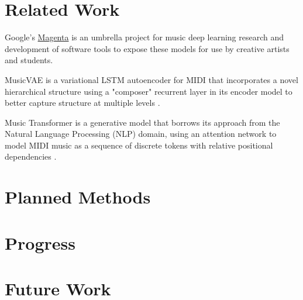 \documentclass[sigconf,authorversion]{acmart}
\begin{document}
\section{Related Work}

Google's \href{https://magenta.tensorflow.org/}{Magenta} is an umbrella project
for music deep learning research and development of software tools to expose
these models for use by creative artists and students.

MusicVAE is a variational LSTM autoencoder for MIDI that incorporates a
novel hierarchical structure using a "composer" recurrent layer in its encoder
model to better capture structure at multiple
levels \cite{roberts_hierarchical_2018}.

Music Transformer is a generative model that borrows its approach from the
Natural Language Processing (NLP) domain, using an attention network to model
MIDI music as a sequence of discrete tokens with relative positional dependencies
\cite{huang_music_2018}.

\section{Planned Methods}

\section{Progress}

\section{Future Work}



\end{document}
